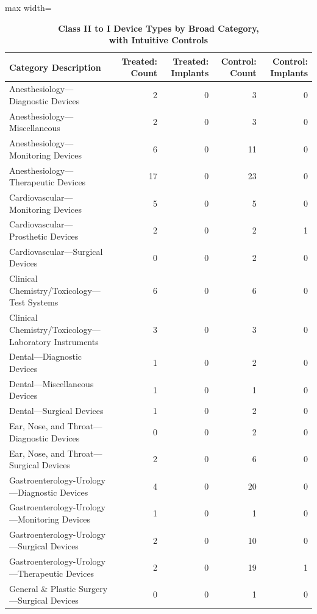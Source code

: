 \documentclass[letterpaper,12pt]{article}
\theoremstyle{definition}
\begin{document}
\clearpage
\newpage





\begin{table}[h!]
\begin{center} 
\caption{\textbf{Class II to I Device Types by Broad Category,\\ with Intuitive Controls}}

\begin{adjustbox}{max width=\textwidth}
\begin{tabular}{@{}lrrrr@{}}
\hline \hline
\textbf{Category Description} & \textbf{Treated: Count} & \textbf{Treated: Implants} & \textbf{Control: Count} & \textbf{Control: Implants} \\
\midrule
Anesthesiology---Diagnostic Devices & 2 & 0 & 3 & 0 \\
Anesthesiology---Miscellaneous & 2 & 0 & 3 & 0 \\
Anesthesiology---Monitoring Devices & 6 & 0 & 11 & 0 \\
Anesthesiology---Therapeutic Devices & 17 & 0 & 23 & 0 \\
Cardiovascular---Monitoring Devices & 5 & 0 & 5 & 0 \\
Cardiovascular---Prosthetic Devices & 2 & 0 & 2 & 1 \\
Cardiovascular---Surgical Devices & 0 & 0 & 2 & 0 \\
Clinical Chemistry/Toxicology---Test Systems & 6 & 0 & 6 & 0 \\
Clinical Chemistry/Toxicology---Laboratory Instruments & 3 & 0 & 3 & 0 \\
Dental---Diagnostic Devices & 1 & 0 & 2 & 0 \\
Dental---Miscellaneous Devices & 1 & 0 & 1 & 0 \\
Dental---Surgical Devices & 1 & 0 & 2 & 0 \\
Ear, Nose, and Throat---Diagnostic Devices & 0 & 0 & 2 & 0 \\
Ear, Nose, and Throat---Surgical Devices & 2 & 0 & 6 & 0 \\
Gastroenterology-Urology---Diagnostic Devices & 4 & 0 & 20 & 0 \\
Gastroenterology-Urology---Monitoring Devices & 1 & 0 & 1 & 0 \\
Gastroenterology-Urology---Surgical Devices & 2 & 0 & 10 & 0 \\
Gastroenterology-Urology---Therapeutic Devices & 2 & 0 & 19 & 1 \\
General \& Plastic Surgery---Surgical Devices & 0 & 0 & 1 & 0 \\

\end{tabular}
\end{adjustbox}
\end{center}
\end{table}
\end{document}
